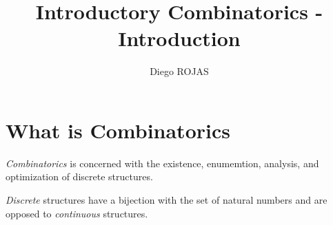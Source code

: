 \documentclass[12pt]{article}
\title{Introductory Combinatorics - Introduction}
\author{Diego ROJAS}
\begin{document}
\maketitle
\tableofcontents

\section{What is Combinatorics}

\textit{Combinatorics} is concerned with the existence, enumemtion, analysis, and optimization of discrete structures.

\textit{Discrete} structures have a bijection with the set of natural numbers and are opposed to \textit{continuous} structures.
\end{document}
